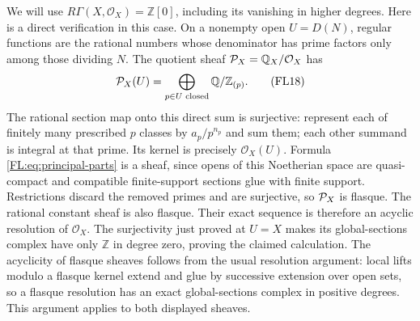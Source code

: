 We will use $R\Gamma(X,\mathcal O_X)=\mathbb Z[0]$, including its
vanishing in higher degrees. Here is a direct verification in this
case. On a nonempty open $U=D(N)$, regular functions are the rational
numbers whose denominator has prime factors only among those dividing
$N$. The quotient sheaf $\mathcal P_X=\mathbb Q_X/\mathcal O_X$ has
\[
 \mathcal P_X(U)=\bigoplus_{p\in U\text{ closed}}\mathbb Q/\mathbb Z_{(p)}.
 \tag{FL18}\label{FL:eq:principal-parts}
\]
The rational section map onto this direct sum is surjective: represent
each of finitely many prescribed $p$ classes by $a_p/p^{n_p}$ and
sum them; each other summand is integral at that prime. Its kernel
is precisely $\mathcal O_X(U)$. Formula \eqref{FL:eq:principal-parts}
is a sheaf, since opens of this Noetherian space are quasi-compact
and compatible finite-support sections glue with finite support.
Restrictions discard the removed primes and are surjective, so
$\mathcal P_X$ is flasque. The rational constant sheaf is also flasque.
Their exact sequence is therefore an acyclic resolution of
$\mathcal O_X$. The surjectivity just proved at $U=X$ makes its
global-sections complex have only $\mathbb Z$ in degree zero, proving
the claimed calculation. The acyclicity of flasque sheaves follows
from the usual resolution argument: local lifts modulo a flasque
kernel extend and glue by successive extension over open sets, so a
flasque resolution has an exact global-sections complex in positive
degrees. This argument applies to both displayed sheaves.

